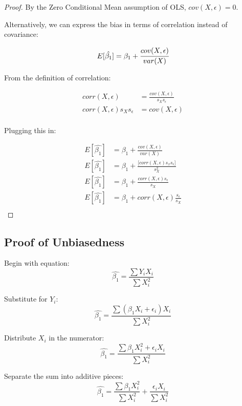 \documentclass{article}
\begin{document}
\begin{proof}
By the Zero Conditional Mean assumption of OLS, $cov(X,\epsilon)=0$. 


Alternatively, we can express the bias in terms of correlation instead of covariance:

\begin{equation*}
E[\hat{\beta_1}]=\beta_1+\cfrac{cov(X,\epsilon)}{var(X)} 
\end{equation*}

From the definition of correlation:

\begin{align*}
	 corr(X,\epsilon)&=\frac{cov(X,\epsilon)}{s_X s_\epsilon}\\
	 corr(X,\epsilon)s_Xs_\epsilon &=cov(X,\epsilon)\\
\end{align*}

Plugging this in: 

\begin{align*}
E[\hat{\beta_1}]&=\beta_1+\frac{cov(X,\epsilon)}{var(X)} \\
E[\hat{\beta_1}]&=\beta_1+\frac{\big[corr(X,\epsilon)s_xs_\epsilon\big]}{s^2_X} \\
E[\hat{\beta_1}]&=\beta_1+\frac{corr(X,\epsilon)s_\epsilon}{s_X} \\
E[\hat{\beta_1}]&=\beta_1+corr(X,\epsilon)\frac{s_\epsilon}{s_X} \\
\end{align*}


\end{proof}

\subsection{Proof of Unbiasedness}

Begin with equation:
\begin{equation}
\hat{\beta_1}=\frac{\sum Y_iX_i}{\sum X_i^2}
\end{equation}

Substitute for $Y_i$:
\begin{equation}
\hat{\beta_1}=\frac{\sum (\beta_1 X_i+\epsilon_i)X_i}{\sum X_i^2}
\end{equation}

Distribute $X_i$ in the numerator:
\begin{equation}
\hat{\beta_1}=\frac{\sum \beta_1 X_i^2+\epsilon_iX_i}{\sum X_i^2}
\end{equation}

Separate the sum into additive pieces:
\begin{equation}
\hat{\beta_1}=\frac{\sum \beta_1 X_i^2}{\sum X_i^2}+\frac{\epsilon_i X_i}{\sum X_i^2}
\end{equation}
\end{document}
